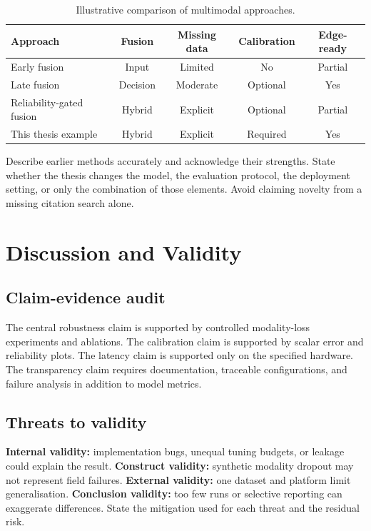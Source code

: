 \begin{table}[htbp]
\centering
\caption{Illustrative comparison of multimodal approaches.}
\label{tab:m-related}
\begin{tabularx}{\textwidth}{Ycccc}
\toprule
Approach & Fusion & Missing data & Calibration & Edge-ready\\
\midrule
Early fusion & Input & Limited & No & Partial\\
Late fusion & Decision & Moderate & Optional & Yes\\
Reliability-gated fusion & Hybrid & Explicit & Optional & Partial\\
This thesis example & Hybrid & Explicit & Required & Yes\\
\bottomrule
\end{tabularx}
\end{table}

Describe earlier methods accurately and acknowledge their strengths. State whether the thesis changes the model, the evaluation protocol, the deployment setting, or only the combination of those elements. Avoid claiming novelty from a missing citation search alone.

\chapter{Discussion and Validity}\label{ch:m-discussion}
\section{Claim-evidence audit}
The central robustness claim is supported by controlled modality-loss experiments and ablations. The calibration claim is supported by scalar error and reliability plots. The latency claim is supported only on the specified hardware. The transparency claim requires documentation, traceable configurations, and failure analysis in addition to model metrics.

\section{Threats to validity}
\textbf{Internal validity:} implementation bugs, unequal tuning budgets, or leakage could explain the result. \textbf{Construct validity:} synthetic modality dropout may not represent field failures. \textbf{External validity:} one dataset and platform limit generalisation. \textbf{Conclusion validity:} too few runs or selective reporting can exaggerate differences. State the mitigation used for each threat and the residual risk.

